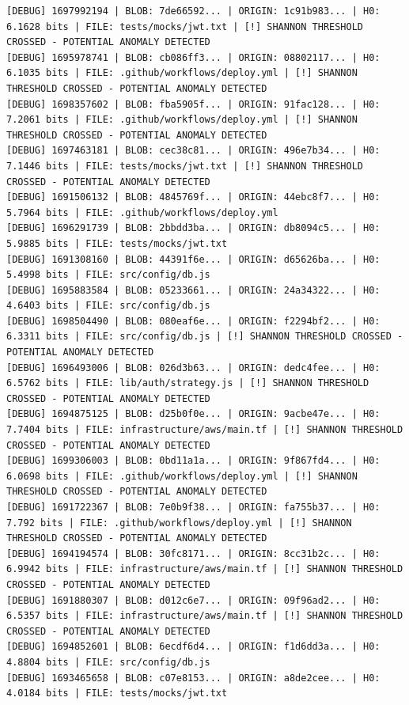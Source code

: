 \documentclass[12pt, a4paper, oneside]{report}
\begin{document}
\begin{lstlisting}[basicstyle=\tiny\ttfamily]
[DEBUG] 1697992194 | BLOB: 7de66592... | ORIGIN: 1c91b983... | H0: 6.1628 bits | FILE: tests/mocks/jwt.txt | [!] SHANNON THRESHOLD CROSSED - POTENTIAL ANOMALY DETECTED
[DEBUG] 1695978741 | BLOB: cb086ff3... | ORIGIN: 08802117... | H0: 6.1035 bits | FILE: .github/workflows/deploy.yml | [!] SHANNON THRESHOLD CROSSED - POTENTIAL ANOMALY DETECTED
[DEBUG] 1698357602 | BLOB: fba5905f... | ORIGIN: 91fac128... | H0: 7.2061 bits | FILE: .github/workflows/deploy.yml | [!] SHANNON THRESHOLD CROSSED - POTENTIAL ANOMALY DETECTED
[DEBUG] 1697463181 | BLOB: cec38c81... | ORIGIN: 496e7b34... | H0: 7.1446 bits | FILE: tests/mocks/jwt.txt | [!] SHANNON THRESHOLD CROSSED - POTENTIAL ANOMALY DETECTED
[DEBUG] 1691506132 | BLOB: 4845769f... | ORIGIN: 44ebc8f7... | H0: 5.7964 bits | FILE: .github/workflows/deploy.yml
[DEBUG] 1696291739 | BLOB: 2bbdd3ba... | ORIGIN: db8094c5... | H0: 5.9885 bits | FILE: tests/mocks/jwt.txt
[DEBUG] 1691308160 | BLOB: 44391f6e... | ORIGIN: d65626ba... | H0: 5.4998 bits | FILE: src/config/db.js
[DEBUG] 1695883584 | BLOB: 05233661... | ORIGIN: 24a34322... | H0: 4.6403 bits | FILE: src/config/db.js
[DEBUG] 1698504490 | BLOB: 080eaf6e... | ORIGIN: f2294bf2... | H0: 6.3311 bits | FILE: src/config/db.js | [!] SHANNON THRESHOLD CROSSED - POTENTIAL ANOMALY DETECTED
[DEBUG] 1696493006 | BLOB: 026d3b63... | ORIGIN: dedc4fee... | H0: 6.5762 bits | FILE: lib/auth/strategy.js | [!] SHANNON THRESHOLD CROSSED - POTENTIAL ANOMALY DETECTED
[DEBUG] 1694875125 | BLOB: d25b0f0e... | ORIGIN: 9acbe47e... | H0: 7.7404 bits | FILE: infrastructure/aws/main.tf | [!] SHANNON THRESHOLD CROSSED - POTENTIAL ANOMALY DETECTED
[DEBUG] 1699306003 | BLOB: 0bd11a1a... | ORIGIN: 9f867fd4... | H0: 6.0698 bits | FILE: .github/workflows/deploy.yml | [!] SHANNON THRESHOLD CROSSED - POTENTIAL ANOMALY DETECTED
[DEBUG] 1691722367 | BLOB: 7e0b9f38... | ORIGIN: fa755b37... | H0: 7.792 bits | FILE: .github/workflows/deploy.yml | [!] SHANNON THRESHOLD CROSSED - POTENTIAL ANOMALY DETECTED
[DEBUG] 1694194574 | BLOB: 30fc8171... | ORIGIN: 8cc31b2c... | H0: 6.9942 bits | FILE: infrastructure/aws/main.tf | [!] SHANNON THRESHOLD CROSSED - POTENTIAL ANOMALY DETECTED
[DEBUG] 1691880307 | BLOB: d012c6e7... | ORIGIN: 09f96ad2... | H0: 6.5357 bits | FILE: infrastructure/aws/main.tf | [!] SHANNON THRESHOLD CROSSED - POTENTIAL ANOMALY DETECTED
[DEBUG] 1694852601 | BLOB: 6ecdf6d4... | ORIGIN: f1d6dd3a... | H0: 4.8804 bits | FILE: src/config/db.js
[DEBUG] 1693465658 | BLOB: c07e8153... | ORIGIN: a8de2cee... | H0: 4.0184 bits | FILE: tests/mocks/jwt.txt

\end{lstlisting}
\end{document}

